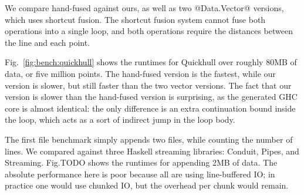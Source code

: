 We compare hand-fused against ours, as well as two @Data.Vector@ versions, which uses shortcut fusion.
The shortcut fusion system cannot fuse both operations into a single loop, and both operations require the distances between the line and each point.

Fig.~\ref{fig:bench:quickhull} shows the runtimes for Quickhull over roughly 80MB of data, or five million points.
The hand-fused version is the fastest, while our version is slower, but still faster than the two vector versions.
The fact that our version is slower than the hand-fused version is surprising, as the generated GHC core is almost identical: the only difference is an extra continuation bound inside the loop, which acts as a sort of indirect jump in the loop body.


The first file benchmark simply appends two files, while counting the number of lines.
We compared against three Haskell streaming libraries: Conduit, Pipes, and Streaming.
Fig.TODO 
shows the runtimes for appending 2MB of data.
The absolute performance here is poor because all are using line-buffered IO; in practice one would use chunked IO, but the overhead per chunk would remain.

